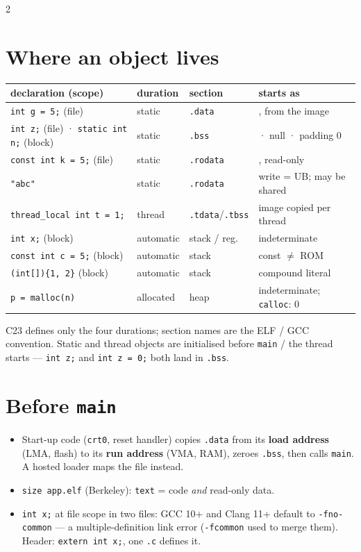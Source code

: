 \documentclass[8pt]{extarticle}
\newcommand\ct[1]{\texttt{#1}}
\begin{document}
\begin{multicols}{2}
\raggedright
\footnotesize{}

\section{Where an object lives}
{\scriptsize\setlength{\tabcolsep}{2pt}
\begin{tabular}{@{}>{\raggedright\arraybackslash}p{29mm}>{\raggedright\arraybackslash}p{9mm}>{\raggedright\arraybackslash}p{14mm}>{\raggedright\arraybackslash}p{23mm}@{}}
\toprule
\textbf{declaration (scope)} & \textbf{duration} & \textbf{section} & \textbf{starts as}\\ \midrule
\ct{int g = 5;} (file) & static & \ct{.data} & 5, from the image\\
\ct{int z;} (file) · \ct{static int n;} (block) & static & \ct{.bss} & 0 · null · padding 0\\
\ct{const int k = 5;} (file) & static & \ct{.rodata} & 5, read-only\\
\ct{"abc"} & static & \ct{.rodata} & write = UB; may be shared\\
\ct{thread\_local int t = 1;} & thread & \ct{.tdata}/\ct{.tbss} & image copied per thread\\
\ct{int x;} (block) & automatic & stack / reg. & \textcolor{sheetRed}{indeterminate}\\
\ct{const int c = 5;} (block) & automatic & stack & const $\neq$ ROM\\
\ct{(int[])\{1, 2\}} (block) & automatic & stack & compound literal\\
\ct{p = malloc(n)} & allocated & heap & indeterminate; \ct{calloc}: 0\\
\bottomrule
\end{tabular}}\par
C23 defines only the four durations; section names are the ELF / GCC convention. Static and
thread objects are initialised before \ct{main} / the thread starts — \ct{int z;} and
\ct{int z = 0;} both land in \ct{.bss}.

\section{Before \texttt{main}}
\begin{itemize}
  \item Start-up code (\ct{crt0}, reset handler) copies \ct{.data} from its \textbf{load address}
        (LMA, flash) to its \textbf{run address} (VMA, RAM), zeroes \ct{.bss}, then calls
        \ct{main}. A hosted loader maps the file instead.
  \item \ct{size app.elf} (Berkeley): \ct{text} = code \emph{and} read-only data.
  \item \ct{int x;} at file scope in two files: GCC 10+ and Clang 11+ default to
        \ct{-fno-common} — a multiple-definition link error (\ct{-fcommon} used to merge them).
        Header: \ct{extern int x;}, one \ct{.c} defines it.
\end{itemize}


\end{multicols}
\end{document}
